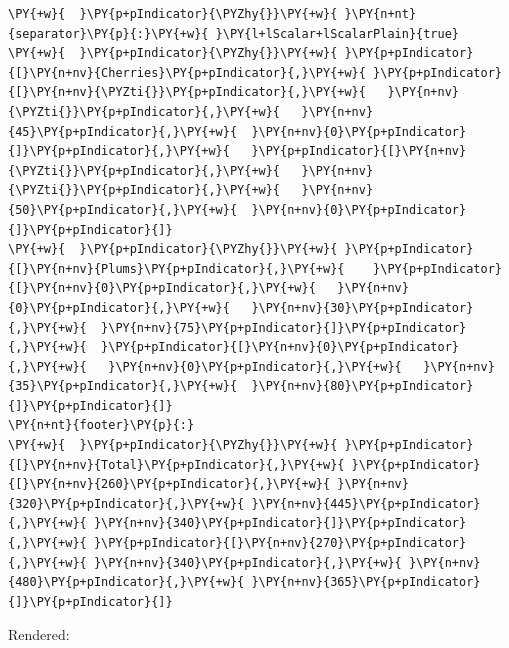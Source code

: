 \documentclass[a4paper,twoside]{article}
\begin{document}
\begin{tscode}[lang=yaml, engine=pygments]
\begin{Verbatim}[commandchars=\\\{\},breaklines, breakanywhere, commandchars=\\\{\}]
\PY{+w}{  }\PY{p+pIndicator}{\PYZhy{}}\PY{+w}{ }\PY{n+nt}{separator}\PY{p}{:}\PY{+w}{ }\PY{l+lScalar+lScalarPlain}{true}
\PY{+w}{  }\PY{p+pIndicator}{\PYZhy{}}\PY{+w}{ }\PY{p+pIndicator}{[}\PY{n+nv}{Cherries}\PY{p+pIndicator}{,}\PY{+w}{ }\PY{p+pIndicator}{[}\PY{n+nv}{\PYZti{}}\PY{p+pIndicator}{,}\PY{+w}{   }\PY{n+nv}{\PYZti{}}\PY{p+pIndicator}{,}\PY{+w}{   }\PY{n+nv}{45}\PY{p+pIndicator}{,}\PY{+w}{  }\PY{n+nv}{0}\PY{p+pIndicator}{]}\PY{p+pIndicator}{,}\PY{+w}{   }\PY{p+pIndicator}{[}\PY{n+nv}{\PYZti{}}\PY{p+pIndicator}{,}\PY{+w}{   }\PY{n+nv}{\PYZti{}}\PY{p+pIndicator}{,}\PY{+w}{   }\PY{n+nv}{50}\PY{p+pIndicator}{,}\PY{+w}{  }\PY{n+nv}{0}\PY{p+pIndicator}{]}\PY{p+pIndicator}{]}
\PY{+w}{  }\PY{p+pIndicator}{\PYZhy{}}\PY{+w}{ }\PY{p+pIndicator}{[}\PY{n+nv}{Plums}\PY{p+pIndicator}{,}\PY{+w}{    }\PY{p+pIndicator}{[}\PY{n+nv}{0}\PY{p+pIndicator}{,}\PY{+w}{   }\PY{n+nv}{0}\PY{p+pIndicator}{,}\PY{+w}{   }\PY{n+nv}{30}\PY{p+pIndicator}{,}\PY{+w}{  }\PY{n+nv}{75}\PY{p+pIndicator}{]}\PY{p+pIndicator}{,}\PY{+w}{  }\PY{p+pIndicator}{[}\PY{n+nv}{0}\PY{p+pIndicator}{,}\PY{+w}{   }\PY{n+nv}{0}\PY{p+pIndicator}{,}\PY{+w}{   }\PY{n+nv}{35}\PY{p+pIndicator}{,}\PY{+w}{  }\PY{n+nv}{80}\PY{p+pIndicator}{]}\PY{p+pIndicator}{]}
\PY{n+nt}{footer}\PY{p}{:}
\PY{+w}{  }\PY{p+pIndicator}{\PYZhy{}}\PY{+w}{ }\PY{p+pIndicator}{[}\PY{n+nv}{Total}\PY{p+pIndicator}{,}\PY{+w}{ }\PY{p+pIndicator}{[}\PY{n+nv}{260}\PY{p+pIndicator}{,}\PY{+w}{ }\PY{n+nv}{320}\PY{p+pIndicator}{,}\PY{+w}{ }\PY{n+nv}{445}\PY{p+pIndicator}{,}\PY{+w}{ }\PY{n+nv}{340}\PY{p+pIndicator}{]}\PY{p+pIndicator}{,}\PY{+w}{ }\PY{p+pIndicator}{[}\PY{n+nv}{270}\PY{p+pIndicator}{,}\PY{+w}{ }\PY{n+nv}{340}\PY{p+pIndicator}{,}\PY{+w}{ }\PY{n+nv}{480}\PY{p+pIndicator}{,}\PY{+w}{ }\PY{n+nv}{365}\PY{p+pIndicator}{]}\PY{p+pIndicator}{]}
\end{Verbatim}
\end{tscode}
Rendered:
\end{document}
